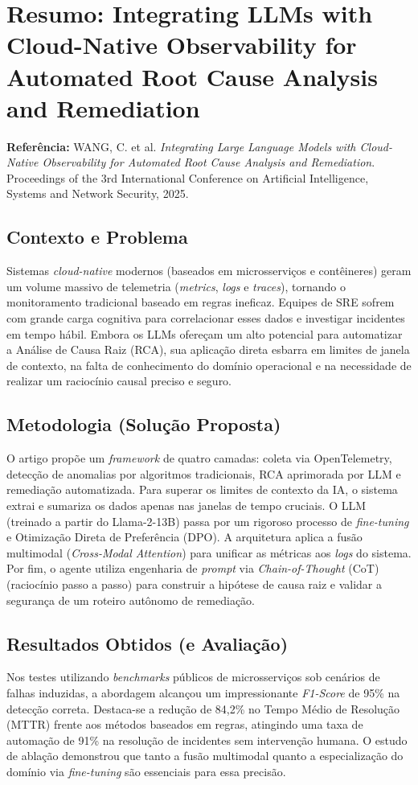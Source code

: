 \documentclass[12pt, a4paper]{article}
\begin{document}
\section*{Resumo: Integrating LLMs with Cloud-Native Observability for Automated Root Cause Analysis and Remediation}
\label{sec:resumo_wang_2025_integrating}

\noindent\textbf{Referência:} WANG, C. et al. \textit{Integrating Large Language Models with Cloud-Native Observability for Automated Root Cause Analysis and Remediation}. Proceedings of the 3rd International Conference on Artificial Intelligence, Systems and Network Security, 2025.

\subsection*{Contexto e Problema}
Sistemas \textit{cloud-native} modernos (baseados em microsserviços e contêineres) geram um volume massivo de telemetria (\textit{metrics}, \textit{logs} e \textit{traces}), tornando o monitoramento tradicional baseado em regras ineficaz. Equipes de SRE sofrem com grande carga cognitiva para correlacionar esses dados e investigar incidentes em tempo hábil. Embora os LLMs ofereçam um alto potencial para automatizar a Análise de Causa Raiz (RCA), sua aplicação direta esbarra em limites de janela de contexto, na falta de conhecimento do domínio operacional e na necessidade de realizar um raciocínio causal preciso e seguro.

\subsection*{Metodologia (Solução Proposta)}
O artigo propõe um \textit{framework} de quatro camadas: coleta via OpenTelemetry, detecção de anomalias por algoritmos tradicionais, RCA aprimorada por LLM e remediação automatizada. Para superar os limites de contexto da IA, o sistema extrai e sumariza os dados apenas nas janelas de tempo cruciais. O LLM (treinado a partir do Llama-2-13B) passa por um rigoroso processo de \textit{fine-tuning} e Otimização Direta de Preferência (DPO). A arquitetura aplica a fusão multimodal (\textit{Cross-Modal Attention}) para unificar as métricas aos \textit{logs} do sistema. Por fim, o agente utiliza engenharia de \textit{prompt} via \textit{Chain-of-Thought} (CoT) (raciocínio passo a passo) para construir a hipótese de causa raiz e validar a segurança de um roteiro autônomo de remediação.

\subsection*{Resultados Obtidos (e Avaliação)}
Nos testes utilizando \textit{benchmarks} públicos de microsserviços sob cenários de falhas induzidas, a abordagem alcançou um impressionante \textit{F1-Score} de 95\% na detecção correta. Destaca-se a redução de 84,2\% no Tempo Médio de Resolução (MTTR) frente aos métodos baseados em regras, atingindo uma taxa de automação de 91\% na resolução de incidentes sem intervenção humana. O estudo de ablação demonstrou que tanto a fusão multimodal quanto a especialização do domínio via \textit{fine-tuning} são essenciais para essa precisão.
\end{document}
